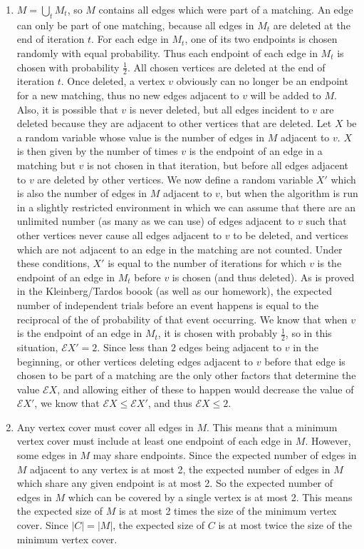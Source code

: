 \documentclass{article}
\begin{document}
\begin{enumerate}
\begin{enumerate}
\item $M = \bigcup_t M_t$, so $M$ contains all edges which were part of a matching.  An edge can only be part of one matching, because all edges in $M_t$ are deleted at the end of iteration $t$. For each edge in $M_t$, one of its two endpoints is chosen randomly with equal probability.  Thus each endpoint of each edge in $M_t$ is chosen with probability $\frac{1}{2}$. All chosen vertices are deleted at the end of iteration $t$. Once deleted, a vertex $v$ obviously can no longer be an endpoint for a new matching, thus no new edges adjacent to $v$ will be added to $M$. Also, it is possible that $v$ is never deleted, but all edges incident to $v$ are deleted because they are adjacent to other vertices that are deleted.  Let $X$ be a random variable whose value is the number of edges in $M$ adjacent to $v$. $X$ is then given by the number of times $v$ is the endpoint of an edge in a matching but $v$ is not chosen in that iteration, but before all edges adjacent to $v$ are deleted by other vertices.   We now define a random variable $X'$ which is also the number of edges in $M$ adjacent to $v$, but when the algorithm is run in a slightly restricted environment in which we can assume that there are an unlimited number (as many as we can use) of edges adjacent to $v$ such that other vertices never cause all edges adjacent to $v$ to be deleted, and vertices which are not adjacent to an edge in the matching are not counted. Under these conditions, $X'$ is equal to the number of iterations for which $v$ is the endpoint of an edge in $M_t$ before $v$ is chosen (and thus deleted). As is proved in the Kleinberg/Tardos boook (as well as our homework), the expected number of independent trials before an event happens is equal to the reciprocal of the of probability of that event occurring.  We know that when $v$ is the endpoint of an edge in $M_t$, it is chosen with probably $\frac{1}{2}$, so in this situation, $\mathcal{E}X' = 2$. Since less than $2$ edges being adjacent to $v$ in the beginning, or other vertices deleting edges adjacent to $v$ before that edge is chosen to be part of a matching are the only other factors that determine the value $\mathcal{E}X$, and allowing either of these to happen would decrease the value of $\mathcal{E}X'$, we know that $\mathcal{E}X \leq \mathcal{E}X'$, and thus $\mathcal{E}X \leq 2$.

\item Any vertex cover must cover all edges in $M$. This means that a minimum vertex cover must include at least one endpoint of each edge in $M$.  However, some edges in $M$ may share endpoints. Since the expected number of edges in $M$ adjacent to any vertex is at most 2, the expected number of edges in $M$ which share any given endpoint is at most 2. So the expected number of edges in $M$ which can be covered by a single vertex is at most 2. This means the expected size of $M$ is at most 2 times the size of the minimum vertex cover.  Since $|C| = |M|$, the expected size of $C$ is at most twice the size of the minimum vertex cover.




\end{enumerate}
\end{enumerate}
\end{document}

